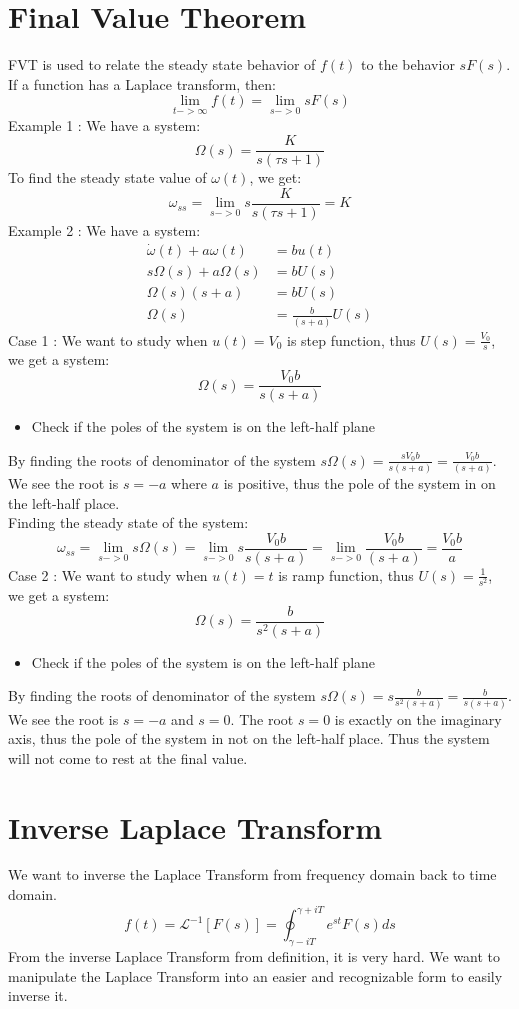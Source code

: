 \documentclass[12pt,a4paper]{article}
\begin{document}
	\section{Final Value Theorem}
	FVT is used to relate the steady state behavior of \(f(t)\) to the behavior \(sF(s)\). If a function has a Laplace transform, then:
	\[
	\lim_{t->\infty} f(t) = \lim_{s->0} sF(s)
	\]
	Example 1 : We have a system:
	\[
	\Omega(s) = \frac{K}{s(\tau s + 1)}
	\]
	To find the steady state value of \(\omega(t)\), we get:
	\[
	\omega_{ss} = \lim_{s->0} s\frac{K}{s(\tau s + 1)} = K
	\]
	Example 2 : We have a system:
	\[
	\begin{split}
		\dot{\omega}(t) + a \omega (t) &= b u(t) \\
		s\Omega(s) + a\Omega(s) &= b U(s) \\
		\Omega(s)(s+a) &= b U(s) \\
		\Omega(s) &= \frac{b}{(s+a)} U(s)
	\end{split}
	\]
	Case 1 : We want to study when \(u(t)=V_0\) is step function, thus \(U(s) = \frac{V_0}{s}\), we get a system:
	\[
	\Omega(s) = \frac{V_0b}{s(s+a)}
	\]
	\begin{itemize}
		\item Check if the poles of the system is on the left-half plane
	\end{itemize}
	By finding the roots of denominator of the system \(s\Omega(s) = \frac{sV_0b}{s(s+a)} = \frac{V_0b}{(s+a)}\). We see the root is \(s = -a\) where \(a\) is positive, thus the pole of the system in on the left-half place. \\
	Finding the steady state of the system:
	\[
	\omega_{ss} = \lim_{s->0} s\Omega(s) = \lim_{s->0} s\frac{V_0b}{s(s+a)} = \lim_{s->0} \frac{V_0b}{(s+a)} = \frac{V_0b}{a}
	\]
	Case 2 : We want to study when \(u(t)=t\) is ramp function, thus \(U(s) = \frac{1}{s^2}\), we get a system:
	\[
	\Omega(s) = \frac{b}{s^2(s+a)}
	\]
	\begin{itemize}
		\item Check if the poles of the system is on the left-half plane
	\end{itemize}
	By finding the roots of denominator of the system \(s\Omega(s) = s\frac{b}{s^2(s+a)} = \frac{b}{s(s+a)}\). We see the root is \(s = -a\) and \(s=0\). The root \(s=0\) is exactly on the imaginary axis, thus the pole of the system in not on the left-half place. Thus the system will not come to rest at the final value.
	
	
	
	
	\section{Inverse Laplace Transform}
	We want to inverse the Laplace Transform from frequency domain back to time domain.
	\[
	f(t) = \mathcal{L}^{-1}[F(s)] = \oint_{{\gamma-iT}}^{{\gamma+iT}} e^{st} F(s) ds
	\]
	From the inverse Laplace Transform from definition, it is very hard. We want to manipulate the Laplace Transform into an easier and recognizable form to easily inverse it. 
	
\end{document}
